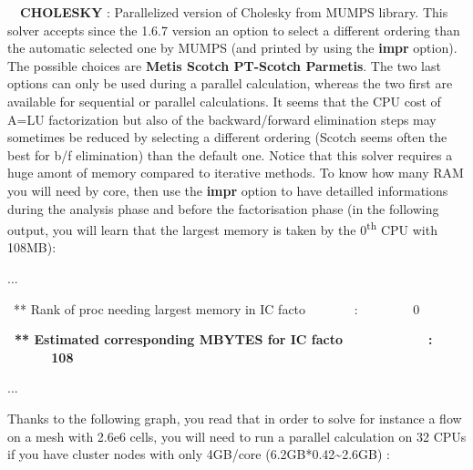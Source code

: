 \ \ \textbf{CHOLESKY} : Parallelized version of Cholesky from MUMPS library. This solver accepts since
the 1.6.7 version an option to select a different ordering than the automatic selected one by MUMPS (and printed by
using the \textbf{impr} option). The possible choices are \textbf{Metis {\textbar} Scotch {\textbar} PT-Scotch
{\textbar} Parmetis}. The two last options can only be used during a parallel calculation, whereas the two first are
available for sequential or parallel calculations. It seems that the CPU cost of A=LU factorization but also of the
backward/forward elimination steps may sometimes be reduced by selecting a different ordering (Scotch seems often the best for b/f elimination) than the default one.
Notice that this solver requires a huge amont of memory compared to iterative methods. To know how many RAM you will
need by core, then use the \textbf{impr} option to have detailled informations during the analysis phase and before the
factorisation phase (in the following output, you will learn that the largest memory is taken by the
0\textsuperscript{th} CPU with 108MB):

...

\ ** Rank of proc needing largest memory in IC facto \ \ \ \ \ \ \ : \ \ \ \ \ \ \ \ 0 

{\bfseries
\ ** Estimated corresponding MBYTES for IC facto \ \ \ \ \ \ \ \ \ \ \ : \ \ \ \ \ \ 108 }

...


\bigskip

Thanks to the following graph, you read that in order to solve for instance a flow on a mesh with 2.6e6 cells, you will
need to run a parallel calculation on 32 CPUs if you have cluster nodes with only 4GB/core (6.2GB*0.42\~{}2.6GB) :



